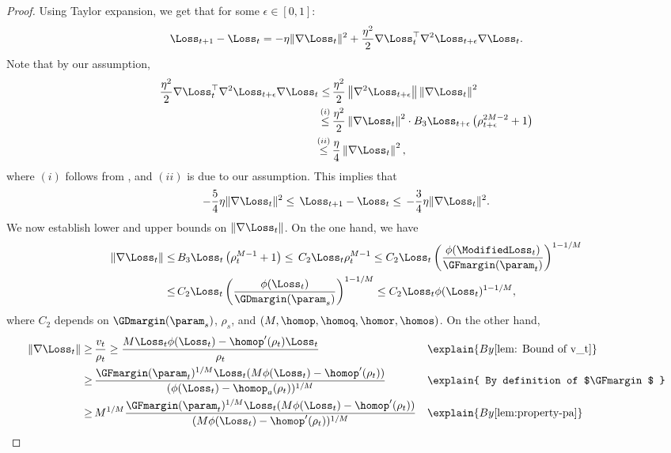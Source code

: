 \begin{proof}
Using Taylor expansion, we get that for some $\epsilon \in [0, 1]$:
\[
\Loss_{t+1} - \Loss_t  = -\eta \|\nabla \Loss_t\|^2 +  \frac{\eta^2}{2} \nabla \Loss_t^\top \nabla^2 \Loss_{t+\epsilon} \nabla \Loss_t.  
\] 
Note that by our assumption,
\begin{align*}
    \frac{\eta^2}{2} \nabla \Loss_t^\top \nabla^2 \Loss_{t+\epsilon} \nabla \Loss_t \le \, & \frac{\eta^2}{2} \left\| \nabla^2 \Loss_{t+\epsilon} \right\| \left\| \nabla \Loss_t \right\|^2 \\
    \stackrel{(i)}{\le} \, & \frac{\eta^2}{2} \left\| \nabla \Loss_t \right\|^2 \cdot B_3 \Loss_{t+\epsilon} \left( \rho_{t+\epsilon}^{2M-2} + 1 \right) \\
    \stackrel{(ii)}{\le} \, & \frac{\eta}{4} \left\| \nabla \Loss_t \right\|^2,
\end{align*}
where $(i)$ follows from , and $(ii)$ is due to our assumption. This implies that
\begin{equation*}
    - \frac{5}{4} \eta \|\nabla \Loss_t\|^2 \le \, \Loss_{t+1} - \Loss_t \le \, - \frac{3}{4} \eta \|\nabla \Loss_t\|^2.
\end{equation*}
We now establish lower and upper bounds on $\|\nabla \Loss_t\|$. On the one hand, we have
\begin{align*}
    \|\nabla \Loss_t \| \le \, & B_3 \Loss_t \left( \rho_t^{M-1} + 1 \right) \le \, C_2 \Loss_t \rho_t^{M-1} \le C_2 \Loss_t \left( \frac{\phi(\ModifiedLoss_t)}{\GFmargin (\param_t)} \right)^{1 - 1/M} \\
    \le \, & C_2 \Loss_t \left( \frac{\phi(\Loss_t)}{\GDmargin (\param_s)} \right)^{1 - 1/M} \le C_2 \Loss_t \phi(\Loss_t)^{1 - 1/M},
\end{align*}
where $C_2$ depends on $\GDmargin(\param_s)$, $\rho_s$, and $(M, \homop, \homoq, \homor, \homos)$. On the other hand,
\begin{align*}
    \| \nabla \Loss_t \| \ge \, & \frac{v_t}{\rho_t} \ge \frac{M\Loss_t \phi(\Loss_t) - \homop^\prime (\rho_t) \Loss_t}{\rho_t} &&\explain{ By \Cref{lem: Bound of v_t}} \\
    \ge \, & \frac{\GFmargin (\param_t)^{1/M} \Loss_t (M \phi(\Loss_t) - \homop^\prime (\rho_t))}{(\phi(\Loss_t) - \homop_a(\rho_t))^{1/M}} &&\explain{ By definition of $\GFmargin$ } \\ 
    \ge \, & M^{1/M} \frac{\GFmargin (\param_t)^{1/M} \Loss_t (M \phi(\Loss_t) - \homop^\prime (\rho_t))}{(M\phi(\Loss_t) - \homop^\prime (\rho_t))^{1/M}} &&\explain{ By \Cref{lem:property-pa} } \\ 

\end{align*}
\end{proof}
